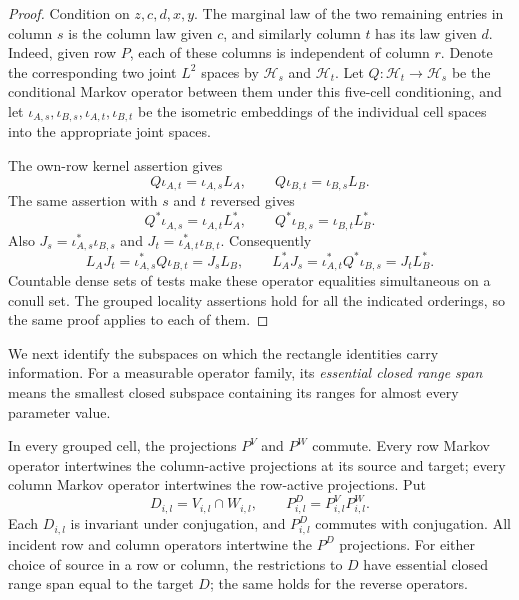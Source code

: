 \begin{proof}
Condition on $z,c,d,x,y$.  The marginal law of the two remaining entries
in column $s$ is the column law given $c$, and similarly column $t$ has
its law given $d$.  Indeed, given row $P$, each of these columns is
independent of column $r$.  Denote the corresponding two joint $L^2$
spaces by $\mathcal H_s$ and $\mathcal H_t$.
Let $Q:\mathcal H_t\to\mathcal H_s$ be the conditional Markov operator
between them under this five-cell conditioning, and let
$\iota_{A,s},\iota_{B,s},\iota_{A,t},\iota_{B,t}$ be the isometric
embeddings of the individual cell spaces into the appropriate joint
spaces.

The own-row kernel assertion gives
\[
 Q\iota_{A,t}=\iota_{A,s}L_A,\qquad
 Q\iota_{B,t}=\iota_{B,s}L_B.
\]
The same assertion with $s$ and $t$ reversed gives
\[
 Q^*\iota_{A,s}=\iota_{A,t}L_A^*,\qquad
 Q^*\iota_{B,s}=\iota_{B,t}L_B^*.
\]
Also $J_s=\iota_{A,s}^*\iota_{B,s}$ and
$J_t=\iota_{A,t}^*\iota_{B,t}$.  Consequently
\[
 L_AJ_t=\iota_{A,s}^*Q\iota_{B,t}=J_sL_B,
 \qquad
 L_A^*J_s=\iota_{A,t}^*Q^*\iota_{B,s}=J_tL_B^*.
\]
Countable dense sets of tests make these operator equalities simultaneous
on a conull set.  The grouped locality assertions hold for all the
indicated orderings, so the same proof applies to each of them.
\end{proof}

We next identify the subspaces on which the rectangle identities carry
information.  For a measurable operator family, its \emph{essential
closed range span} means the smallest closed subspace containing its
ranges for almost every parameter value.

\begin{lemma}\label{lem:active-reduction}
In every grouped cell, the projections $P^V$ and $P^W$ commute.  Every row
Markov operator intertwines the column-active projections at its source
and target; every column Markov operator intertwines the row-active
projections.  Put
\[
 D_{i,l}=V_{i,l}\cap W_{i,l},\qquad
 P^D_{i,l}=P^V_{i,l}P^W_{i,l}.
\]
Each $D_{i,l}$ is invariant under conjugation, and $P^D_{i,l}$ commutes
with conjugation.
All incident row and column operators intertwine the $P^D$ projections.
For either choice of source in a row or column, the restrictions to $D$
have essential closed range span equal to the target $D$; the same holds
for the reverse operators.
\end{lemma}

